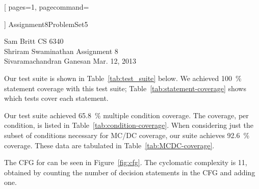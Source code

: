 \documentclass{article}
\newcommand\codefamily{\ttfamily}  %
\newcommand\code[1]{\text{\codefamily #1}}
\begin{document}
\thispagestyle{empty}


  [
    pages=1,
    pagecommand=
      {
      }
  ]
  {Assignment8ProblemSet5}

\clearpage
{}

\noindent
Sam Britt                \hfill CS 6340      \\
Shriram Swaminathan      \hfill Assignment 8 \\
Sivaramachandran Ganesan \hfill Mar. 12, 2013

Our test suite is shown in Table~\ref{tab:test_suite} below. We
achieved \SI{100}{\percent} statement coverage with this test suite;
Table~\ref{tab:statement-coverage} shows which tests cover each
statement.

Our test suite achieved \SI{65.8}{\percent} multiple condition
coverage. The coverage, per condition, is listed in
Table~\ref{tab:condition-coverage}. When considering just the subset
of conditions necessary for MC/DC coverage, our suite achieves
\SI{92.6}{\percent} coverage. These data are tabulated in
Table~\ref{tab:MCDC-coverage}.

The CFG for \code{tritype.c} can be seen in Figure~\ref{fig:cfg}. The
cyclomatic complexity is 11, obtained by counting the number of
decision statements in the CFG and adding one.
\end{document}

